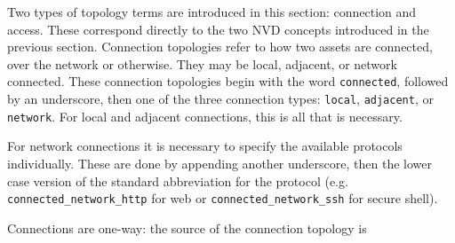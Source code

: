 Two types of topology terms are introduced in this section: connection and access. These
correspond directly to the two NVD concepts introduced in the previous section.
Connection topologies refer to how two assets are connected, over the network or otherwise.
They may be local, adjacent, or network connected. These connection topologies begin with
the word \texttt{connected}, followed by an underscore, then one of the three connection
types: \texttt{local}, \texttt{adjacent}, or \texttt{network}. For local and adjacent
connections, this is all that is necessary. 

For network connections it is
necessary to specify the available protocols individually. These are done by appending another
underscore, then the lower case version of the standard abbreviation for the protocol
(e.g. \texttt{connected\_network\_http} for web or \texttt{connected\_network\_ssh} for
secure shell).

Connections are one-way: the source of the connection topology is 

